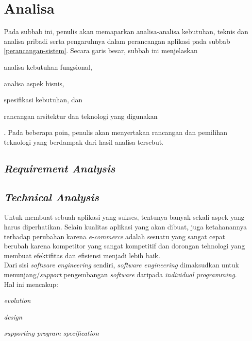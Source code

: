 \section{Analisa}
	Pada subbab ini, penulis akan memaparkan analisa-analisa kebutuhan, teknis dan analisa pribadi serta pengaruhnya dalam perancangan aplikasi pada subbab \ref{perancangan-sistem}. Secara garis besar, subbab ini menjelaskan \begin{inlinelist}
		\item analisa kebutuhan fungsional,
		\item analisa aspek bisnis,
		\item spesifikasi kebutuhan, dan
		\item rancangan arsitektur dan teknologi yang digunakan
	\end{inlinelist}. Pada beberapa poin, penulis akan menyertakan rancangan dan pemilihan teknologi yang berdampak dari hasil analisa tersebut.
	
	\subsection{\textit{Requirement Analysis}}
	
	
	 
	 


	\subsection{\textit{Technical Analysis}}
	\label{tech-analysis}
	
	Untuk membuat sebuah aplikasi yang sukses, tentunya banyak sekali aspek yang harus diperhatikan. Selain kualitas aplikasi yang akan dibuat, juga ketahanannya terhadap perubahan karena \textit{e-commerce} adalah sesuatu yang sangat cepat berubah karena kompetitor yang sangat kompetitif dan dorongan tehnologi yang membuat efektifitas dan efisiensi menjadi lebih baik.\\
	
	\indent Dari sisi \textit{software engineering} sendiri, \textit{software engineering} dimaksudkan untuk menunjang/\textit{support} pengembangan \textit{software} daripada \textit{individual programming}. Hal ini mencakup: \begin{inlinelist}
		\item \textit{evolution}
		\item \textit{design}
		\item \textit{supporting program specification}
	\end{inlinelist} \cite[p.~5]{software-engineering}
	

